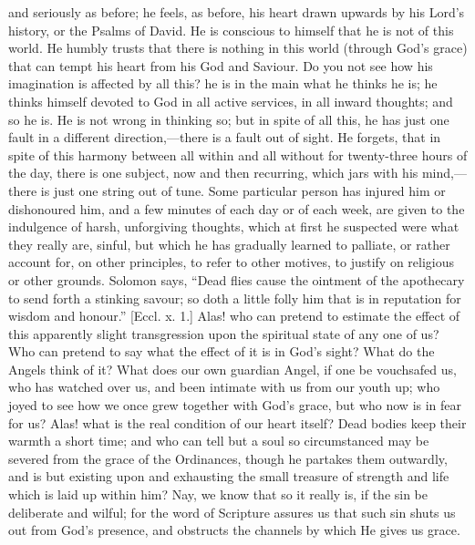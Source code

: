 and seriously as before; he feels, as before, his heart drawn upwards
by his Lord's history, or the Psalms of David. He is conscious to
himself that he is not of this world. He humbly trusts that there is
nothing in this world (through God's grace) that can tempt his heart
from his God and Saviour. Do you not see how his imagination is
affected by all this? he is in the main what he thinks he is; he
thinks himself devoted to God in all active services, in all inward
thoughts; and so he is. He is not wrong in thinking so; but in spite
of all this, he has just one fault in a different direction,—there
is a fault out of sight. He forgets, that in spite of this harmony
between all within and all without for twenty-three hours of the day,
there is one subject, now and then recurring, which jars with his
mind,—there is just one string out of tune. Some particular person
has injured him or dishonoured him, and a few minutes of each day or
of each week, are given to the indulgence of harsh, unforgiving
thoughts, which at first he suspected were what they really are,
sinful, but which he has gradually learned to palliate, or rather
account for, on other principles, to refer to other motives, to
justify on religious or other grounds. Solomon says, ``Dead flies
cause the ointment of the apothecary to send forth a stinking savour;
so doth a little folly him that is in reputation for wisdom and
honour.'' [Eccl. x. 1.] Alas! who can pretend to estimate the
effect of this apparently slight transgression upon the spiritual
state of any one of us? Who can pretend to say what the effect of it
is in God's sight? What do the Angels think of it? What does our own
guardian Angel, if one be vouchsafed us, who has watched over us, and
been intimate with us from our youth up; who joyed to see how we once
grew together with God's grace, but who now is in fear for us? Alas!
what is the real condition of our heart itself? Dead bodies keep their
warmth a short time; and who can tell but a soul so circumstanced may
be severed from the grace of the Ordinances, though he partakes them
outwardly, and is but existing upon and exhausting the small treasure
of strength and life which is laid up within him? Nay, we know that so
it really is, if the sin be deliberate and wilful; for the word of
Scripture assures us that such sin shuts us out from God's presence,
and obstructs the channels by which He gives us grace.

